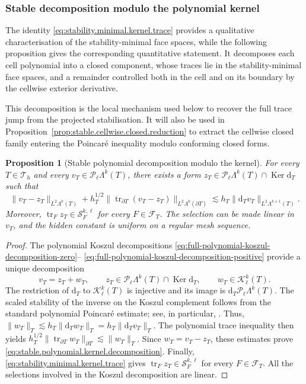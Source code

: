 \documentclass[a4paper,11pt]{article}
\newtheorem{proposition}[theorem]{Proposition}
\theoremstyle{definition}
\newcommand{\DIFF}{\mathrm{d}}
\newcommand{\PL}[2]{\mathcal{P}_{#1}\Lambda^{#2}}
\newcommand{\trc}{\operatorname{tr}}
\newcommand{\Ker}{\operatorname{Ker}}
\begin{document}
\subsubsection{Stable decomposition modulo the polynomial kernel}

The identity \eqref{eq:stability.minimal.kernel.trace} provides a qualitative characterisation of the stability-minimal face spaces, while the following proposition gives the corresponding quantitative statement.
It decomposes each cell polynomial into a closed component, whose traces lie in the stability-minimal face spaces, and a remainder controlled both in the cell and on its boundary by the cellwise exterior derivative.

This decomposition is the local mechanism used below to recover the full trace jump from the projected stabilisation.
It will also be used in Proposition~\ref{prop:stable.cellwise.closed.reduction} to extract the cellwise closed family entering the Poincar\'e inequality modulo conforming closed forms.

\begin{proposition}[Stable polynomial decomposition modulo the kernel]
\label{prop:stable.polynomial.kernel.decomposition}
For every $T\in\mathcal T_h$ and every $v_T\in\PL{\ell}{k}(T)$, there exists a form $z_T\in\PL{\ell}{k}(T)\cap\Ker\DIFF_T$ such that
\begin{equation}\label{eq:stable.polynomial.kernel.decomposition}
  \|v_T-z_T\|_{L^2\Lambda^k(T)}
  +
  h_T^{1/2}
  \|\trc_{\partial T}(v_T-z_T)\|_{L^2\Lambda^k(\partial T)}
  \lesssim
  h_T
  \|\DIFF_Tv_T\|_{L^2\Lambda^{k+1}(T)}.
\end{equation}
Moreover, $\trc_Fz_T\in\mathcal S_F^{k,\ell}$ for every $F\in\mathcal F_T$.
The selection can be made linear in $v_T$, and the hidden constant is uniform on a regular mesh sequence.
\end{proposition}
\begin{proof}
The polynomial Koszul decompositions \eqref{eq:full-polynomial-koszul-decomposition-zero}-- \eqref{eq:full-polynomial-koszul-decomposition-positive} provide a unique decomposition
\[
v_T=
z_T+w_T,\qquad
z_T\in\PL{\ell}{k}(T)\cap\Ker\DIFF_T,\qquad
w_T\in\mathcal K_\ell^k(T).
\]
The restriction of $\DIFF_T$ to $\mathcal K_\ell^k(T)$ is injective and its image is $\DIFF_T\PL{\ell}{k}(T)$.
The scaled stability of the inverse on the Koszul complement follows from the standard polynomial Poincar\'e estimate; see, in particular, \cite[Lemmas~16--17]{Di-Pietro.Droniou.ea:25}.
Thus, $\|w_T\|_T \lesssim h_T \|\DIFF_Tw_T\|_T = h_T \|\DIFF_Tv_T\|_T$.
The polynomial trace inequality then yields $h_T^{1/2} \|\trc_{\partial T}w_T\|_{\partial T} \lesssim \|w_T\|_T$.
Since $w_T=v_T-z_T$, these estimates prove \eqref{eq:stable.polynomial.kernel.decomposition}.
Finally, \eqref{eq:stability.minimal.kernel.trace} gives $\trc_Fz_T\in\mathcal S_F^{k,\ell}$ for every $F\in\mathcal F_T$.
All the selections involved in the Koszul decomposition are linear.
\end{proof}
\end{document}
